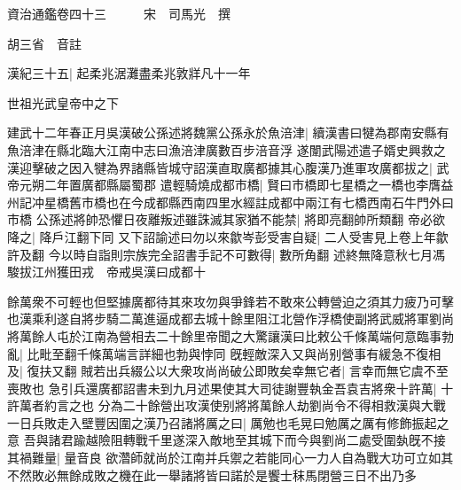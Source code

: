 






























































資治通鑑卷四十三　　　宋　司馬光　撰

胡三省　音註

漢紀三十五|{
	起柔兆涺灘盡柔兆敦牂凡十一年}


世祖光武皇帝中之下

建武十二年春正月吳漢破公孫述將魏黨公孫永於魚涪津|{
	續漢書曰犍為郡南安縣有魚涪津在縣北臨大江南中志曰漁涪津廣數百步涪音浮}
遂闈武陽述遣子婿史興救之漢迎擊破之因入犍為界諸縣皆城守詔漢直取廣都據其心腹漢乃進軍攻廣都拔之|{
	武帝元朔二年置廣都縣屬蜀郡}
遣輕騎燒成都市橋|{
	賢曰市橋即七星橋之一橋也李膺益州記冲星橋舊市橋也在今成都縣西南四里水經註成都中兩江有七橋西南石牛門外曰市橋}
公孫述將帥恐懼日夜離叛述雖誅滅其家猶不能禁|{
	將即亮翻帥所類翻}
帝必欲降之|{
	降戶江翻下同}
又下詔諭述曰勿以來歙岑彭受害自疑|{
	二人受害見上卷上年歙許及翻}
今以時自詣則宗族完全詔書手記不可數得|{
	數所角翻}
述終無降意秋七月馮駿拔江州獲田戎　帝戒吳漢曰成都十

餘萬衆不可輕也但堅據廣都待其來攻勿與爭鋒若不敢來公轉營迫之須其力疲乃可擊也漢乘利遂自將步騎二萬進逼成都去城十餘里阻江北營作浮橋使副將武威將軍劉尚將萬餘人屯於江南為營相去二十餘里帝聞之大驚讓漢曰比敕公千條萬端何意臨事勃亂|{
	比毗至翻千條萬端言詳細也勃與悖同}
旣輕敵深入又與尚别營事有緩急不復相及|{
	復扶又翻}
賊若出兵綴公以大衆攻尚尚破公即敗矣幸無它者|{
	言幸而無它虞不至喪敗也}
急引兵還廣都詔書未到九月述果使其大司徒謝豐執金吾袁吉將衆十許萬|{
	十許萬者約言之也}
分為二十餘營出攻漢使别將將萬餘人劫劉尚令不得相救漢與大戰一日兵敗走入壁豐因圍之漢乃召諸將厲之曰|{
	厲勉也毛晃曰勉厲之厲有修飾振起之意}
吾與諸君踰越險阻轉戰千里遂深入敵地至其城下而今與劉尚二處受圍埶旣不接其禍難量|{
	量音良}
欲濳師就尚於江南并兵禦之若能同心一力人自為戰大功可立如其不然敗必無餘成敗之機在此一舉諸將皆曰諾於是饗士秣馬閉營三日不出乃多

